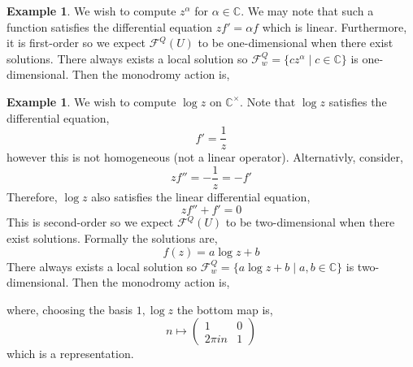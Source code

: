 \documentclass[12pt]{extarticle}
\newcommand{\Z}{\mathbb{Z}}
\newcommand{\C}{\mathbb{C}}
\theoremstyle{definition}
\newtheorem{example}[theorem]{Example}
\newcommand{\F}{\mathcal{F}}
\newcommand{\GL}[2]{\mathrm{GL}_{#1}\left( #2 \right)}
\begin{document}
\begin{example}
We wish to compute $z^\alpha$ for $\alpha \in \C$. We may note that such a function satisfies the differential equation $z f' = \alpha f$ which is linear. Furthermore, it is first-order so we expect $\F^Q(U)$ to be one-dimensional when there exist solutions. There always exists a local solution so $\F^Q_w = \{ c z^\alpha \mid c \in \C \}$ is one-dimensional. Then the monodromy action is,
\begin{center}
\end{center}
\end{example}

\begin{example}
We wish to compute $\log{z}$ on $\C^\times$. Note that $\log{z}$ satisfies the differential equation,
\[ f' = \frac{1}{z} \]
however this is not homogeneous (not a linear operator). Alternativly, consider,
\[ z f'' = - \frac{1}{z} = -  f' \] 
Therefore, $\log{z}$ also satisfies the linear differential equation,
\[ z f'' + f' = 0 \]  
This is second-order so we expect $\F^Q(U)$ to be two-dimensional when there exist solutions. Formally the solutions are,
\[ f(z) = a \log{z} + b \]
There always exists a local solution so $\F^Q_w = \{ a \log{z} + b \mid a,b \in \C \}$ is two-dimensional. Then the monodromy action is,
\begin{center}
\end{center}
where, choosing the basis $1, \log{z}$ the bottom map is,
\[ n \mapsto 
\begin{pmatrix}
1 & 0
\\
2 \pi i n & 1 
\end{pmatrix} \]
which is a representation.
\end{example}
\end{document}
